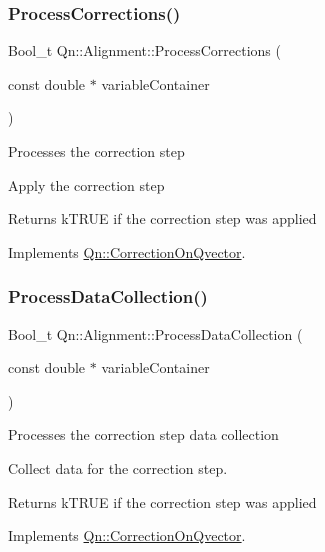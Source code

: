 \subsubsection{\texorpdfstring{Process\+Corrections()}{ProcessCorrections()}}
{\footnotesize\ttfamily Bool\+\_\+t Qn\+::\+Alignment\+::\+Process\+Corrections (\begin{DoxyParamCaption}\item[{const double $\ast$}]{variable\+Container }\end{DoxyParamCaption})\hspace{0.3cm}{\ttfamily [virtual]}}

Processes the correction step

Apply the correction step \begin{DoxyReturn}{Returns}
k\+T\+R\+UE if the correction step was applied 
\end{DoxyReturn}


Implements \mbox{\hyperlink{classQn_1_1CorrectionOnQvector_a2c2d7f0e48471fb9269f0b5f9aa3e836}{Qn\+::\+Correction\+On\+Qvector}}.

\mbox{\label{classQn_1_1Alignment_af071fa4f51958ecfec6e6c58a7d84c84}} 
\subsubsection{\texorpdfstring{Process\+Data\+Collection()}{ProcessDataCollection()}}
{\footnotesize\ttfamily Bool\+\_\+t Qn\+::\+Alignment\+::\+Process\+Data\+Collection (\begin{DoxyParamCaption}\item[{const double $\ast$}]{variable\+Container }\end{DoxyParamCaption})\hspace{0.3cm}{\ttfamily [virtual]}}

Processes the correction step data collection

Collect data for the correction step. \begin{DoxyReturn}{Returns}
k\+T\+R\+UE if the correction step was applied 
\end{DoxyReturn}


Implements \mbox{\hyperlink{classQn_1_1CorrectionOnQvector_a2c0a668d885b5a42503869303c859a0b}{Qn\+::\+Correction\+On\+Qvector}}.

